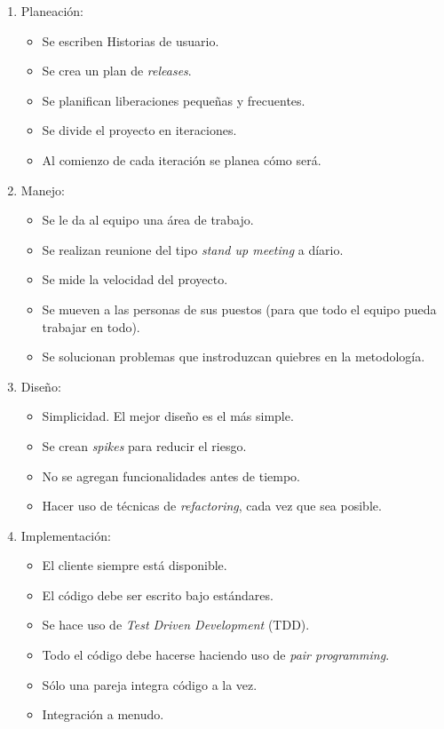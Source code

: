 \begin{enumerate}
\item Planeación:
	\begin{itemize}
	\item Se escriben Historias de usuario. 
	\item Se crea un plan de \textit{releases}.
	\item Se planifican liberaciones pequeñas y frecuentes.
	\item Se divide el proyecto en iteraciones.
	\item Al comienzo de cada iteración se planea cómo será.
	\end{itemize}
\item Manejo:
	\begin{itemize}
	\item Se le da al equipo una área de trabajo.
	\item Se realizan reunione del tipo \textit{stand up meeting} a díario.
	\item Se mide la velocidad del proyecto. 
	\item Se mueven a las personas de sus puestos (para que todo el equipo pueda trabajar en todo).
	\item Se solucionan problemas que instroduzcan quiebres en la metodología.
	\end{itemize}
\item Diseño:
	\begin{itemize}
	\item Simplicidad. El mejor diseño es el más simple.
	\item Se crean \textit{spikes} para reducir el riesgo.
	\item No se agregan funcionalidades antes de tiempo.
	\item Hacer uso de técnicas de \textit{refactoring}, cada vez que sea posible.
	\end{itemize}
\item Implementación:
	\begin{itemize}
	\item El cliente siempre está disponible. 
	\item El código debe ser escrito bajo estándares. 
	\item Se hace uso de \textit{Test Driven Development }(TDD).
	\item Todo el código debe hacerse haciendo uso de \textit{pair programming}.
	\item Sólo una pareja integra código a la vez.
	\item Integración a menudo.

\end{itemize}
\end{enumerate}

